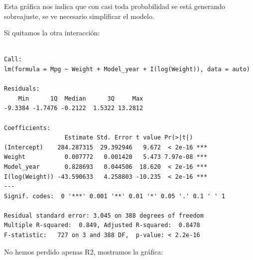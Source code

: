 \documentclass[
]{article}
\newenvironment{Shaded}{\begin{snugshade}}{\end{snugshade}}
\newcommand{\DataTypeTok}[1]{\textcolor[rgb]{0.13,0.29,0.53}{#1}}
\newcommand{\KeywordTok}[1]{\textcolor[rgb]{0.13,0.29,0.53}{\textbf{#1}}}
\newcommand{\NormalTok}[1]{#1}
\newcommand{\OperatorTok}[1]{\textcolor[rgb]{0.81,0.36,0.00}{\textbf{#1}}}
\newcommand{\StringTok}[1]{\textcolor[rgb]{0.31,0.60,0.02}{#1}}
\begin{document}
Esta gráfica nos indica que con casi toda probabilidad se está generando
sobreajuste, se ve necesario simplificar el modelo.

Si quitamos la otra interacción:

\begin{Shaded}
\end{Shaded}

\begin{verbatim}

Call:
lm(formula = Mpg ~ Weight + Model_year + I(log(Weight)), data = auto)

Residuals:
    Min      1Q  Median      3Q     Max 
-9.3384 -1.7476 -0.2122  1.5322 13.2812 

Coefficients:
                 Estimate Std. Error t value Pr(>|t|)    
(Intercept)    284.287315  29.392946   9.672  < 2e-16 ***
Weight           0.007772   0.001420   5.473 7.97e-08 ***
Model_year       0.828693   0.044506  18.620  < 2e-16 ***
I(log(Weight)) -43.590633   4.258803 -10.235  < 2e-16 ***
---
Signif. codes:  0 '***' 0.001 '**' 0.01 '*' 0.05 '.' 0.1 ' ' 1

Residual standard error: 3.045 on 388 degrees of freedom
Multiple R-squared:  0.849, Adjusted R-squared:  0.8478 
F-statistic:   727 on 3 and 388 DF,  p-value: < 2.2e-16
\end{verbatim}

No hemos perdido apenas R2, mostramos la gráfica:
\end{document}

